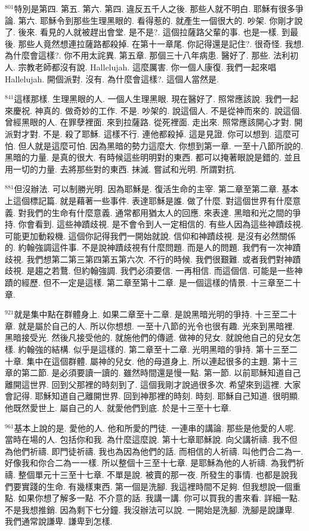 \documentclass{book}
\begin{document}
$^{801}$特別是第四.
第五.
第六.
第四.
違反五千人之後.
那些人就不明白.
耶穌有很多爭論.
第六.
耶穌令到那些生理黑眼的.
看得惹的.
就產生一個很大的.
吵架.
你剛才說了.
後來.
看見的人就被趕出會堂.
是不是?.
這個拉薩路父輩的事.
也是一樣.
到最後.
那些人竟然想連拉薩路都殺掉.
在第十一章尾.
你記得還是記住?.
很奇怪.
我想.
為什麼會這樣?.
你不用太詫異.
第五章.
那個三十八年病患.
醫好了.
那些.
法利初人.
宗教老師都沒有說.
Hallelujah.
這麼厲害.
你一個人康復.
我們一起來唱Hallelujah.
開個派對.
沒有.
為什麼會這樣?.
這個人當然是.

$^{841}$這樣那樣.
生理黑眼的人.
一個人生理黑眼.
現在醫好了.
照常應該說.
我們一起來慶祝.
神真的.
做奇妙的工作.
不是.
吵架的.
說這個人.
不是從神而來的.
說這個.
曾經黑眼的人.
在罪孽裡面.
來到拉薩路.
從死裡面.
走出來.
照常應該開心才對.
開派對才對.
不是.
殺了耶穌.
這樣不行.
連他都殺掉.
這是見證.
你可以想到.
這麼可怕.
但人就是這麼可怕.
因為黑暗的勢力這麼大.
你想到第一章.
一至十八節所說的.
黑暗的力量.
是真的很大.
有時候這些明明對的東西.
都可以掩著眼說是錯的.
並且用一切的力量.
去將那些對的東西.
抹滅.
嘗試和光明.
所謂對抗.

$^{881}$但沒辦法.
可以制勝光明.
因為耶穌是.
復活生命的主宰.
第二章至第二章.
基本上這個標記篇.
就是藉著一些事件.
表達耶穌是誰.
做了什麼.
對這個世界有什麼意義.
對我們的生命有什麼意義.
通常都用猶太人的回應.
來表達.
黑暗和光之間的爭持.
你會看到.
這些神蹟歧視.
是不會令到人一定相信的.
有些人因為這些神蹟歧視.
可能更加動殺機.
這個你記得我們一開始就說.
信仰和神蹟歧視.
是沒有必然關係的.
約翰強調這件事.
不是說神蹟歧視有什麼問題.
而是人的問題.
我們有一次神蹟歧視.
我們想第二第三第四第五第六次.
不行的時候.
我們很艱難.
或者我們對神蹟歧視.
是趨之若鶩.
但約翰強調.
我們必須要信.
一再相信.
而這個信.
可能是一些神蹟的經歷.
但不一定是這樣.
第二章至第十二章.
是一個這樣的情景.
十三章至二十章.

$^{921}$就是集中點在群體身上.
如果二章至十二章.
是說黑暗光明的爭持.
十三至二十章.
就是屬於自己的人.
所以你想想.
一至十八節的光令也很有趣.
光來到黑暗裡.
黑暗接受光.
然後凡接受他的.
就施他們的傳遞.
做神的兒女.
就說他自己的兒女怎樣.
約翰強的結構.
似乎是這樣的.
第二章至十二章.
光明黑暗的爭持.
第十三至二十章.
集中在這個群體.
屬神的兒女.
他的母道身上.
所以連起很多的主題.
第十三章的第二節.
是必須要讀一讀的.
雖然時間還是慢一點.
第一節.
以前耶穌知道自己離開這世界.
回到父那裡的時刻到了.
這個我剛才說過很多次.
希望來到這裡.
大家會記得.
耶穌知道自己離開世界.
回到神那裡的時刻.
時刻.
耶穌自己知道.
很明顯.
他既然愛世上.
屬自己的人.
就愛他們到底.
於是十三至十七章.

$^{961}$基本上說的是.
愛他的人.
他和所愛的門徒.
一連串的講論.
那些是他愛的人呢.
當時在場的人.
包括你和我.
為什麼這麼說.
第十七章耶穌說.
向父講祈禱.
我不但為他們祈禱.
即門徒祈禱.
我也為因為他們的話.
而相信的人祈禱.
叫他們合二為一.
好像我和你合二為一一樣.
所以整個十三至十七章.
是耶穌為他的人祈禱.
為我們祈禱.
整個單元十三至十七章.
不單是說.
被賣的那一夜.
所發生的事情.
也都是說我們要實踐的生命.
有幾樣東西.
第一個是洗腳.
我這裡時間不足夠.
但我想說一個重點.
如果你想了解多一點.
不介意的話.
我講一講.
你可以買我的書來看.
詳細一點.
不是我想推銷.
因為剩下七分鐘.
我沒辦法可以說.
一開始是洗腳.
洗腳是說謙卑.
我們通常說謙卑.
謙卑到怎樣.
\end{document}
